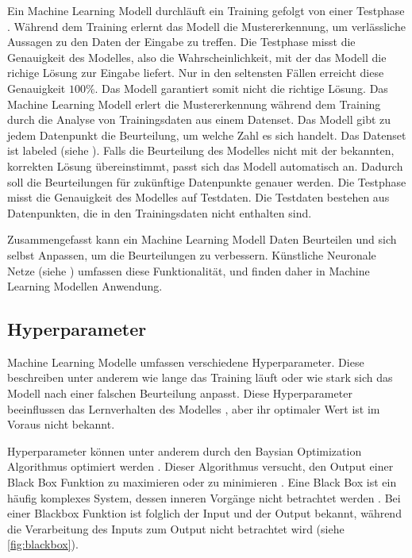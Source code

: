                 
Ein Machine Learning Modell durchläuft ein Training gefolgt von einer Testphase
\cite{noauthor_training_nodate}. Während dem Training erlernt das Modell die
Mustererkennung, um verlässliche Aussagen zu den Daten der Eingabe zu treffen.
Die Testphase misst die Genauigkeit des Modelles, also die Wahrscheinlichkeit,
mit der das Modell die richige Lösung zur Eingabe liefert. Nur in den seltensten
Fällen erreicht diese Genauigkeit $100\%$. Das Modell garantiert somit nicht die
richtige Lösung. Das Machine Learning Modell erlert die Mustererkennung während
dem Training durch die Analyse von Trainingsdaten aus einem Datenset. Das Modell
gibt zu jedem Datenpunkt die Beurteilung, um welche Zahl es sich handelt. Das
Datenset ist labeled (siehe ). Falls die Beurteilung des
Modelles nicht mit der bekannten, korrekten Lösung übereinstimmt, passt sich das
Modell automatisch an. Dadurch soll die Beurteilungen für zukünftige Datenpunkte
genauer werden. Die Testphase misst die Genauigkeit des Modelles auf Testdaten.
Die Testdaten bestehen aus Datenpunkten, die in den Trainingsdaten nicht
enthalten sind.

Zusammengefasst kann ein Machine Learning Modell Daten Beurteilen und sich
selbst Anpassen, um die Beurteilungen zu verbessern. Künstliche Neuronale Netze
(siehe ) umfassen diese Funktionalität, und finden daher in
Machine Learning Modellen Anwendung.


\subsection{Hyperparameter}\label{sub:t_ml_hyper}
Machine Learning Modelle umfassen verschiedene Hyperparameter. Diese beschreiben
unter anderem wie lange das Training läuft oder wie stark sich das Modell nach
einer falschen Beurteilung anpasst. Diese Hyperparameter beeinflussen das
Lernverhalten des Modelles \cite{nyuytiymbiy_parameters_2022}, aber ihr optimaler Wert ist im
Voraus nicht bekannt.

Hyperparameter können unter anderem durch den Baysian Optimization Algorithmus
optimiert werden \cite{agnihotri_exploring_2020}\cite{paretos_bayesian_2021}.
Dieser Algorithmus versucht, den Output einer Black Box Funktion zu maximieren
oder zu minimieren \cite[S. 15]{garnett_bayesian_nodate}. Eine Black Box ist ein
häufig komplexes System, dessen inneren Vorgänge nicht betrachtet werden
\cite{noauthor_black_2021}. Bei einer Blackbox Funktion ist folglich der Input
und der Output bekannt, während die Verarbeitung des Inputs zum Output nicht
betrachtet wird (siehe \autoref{fig:blackbox}).

